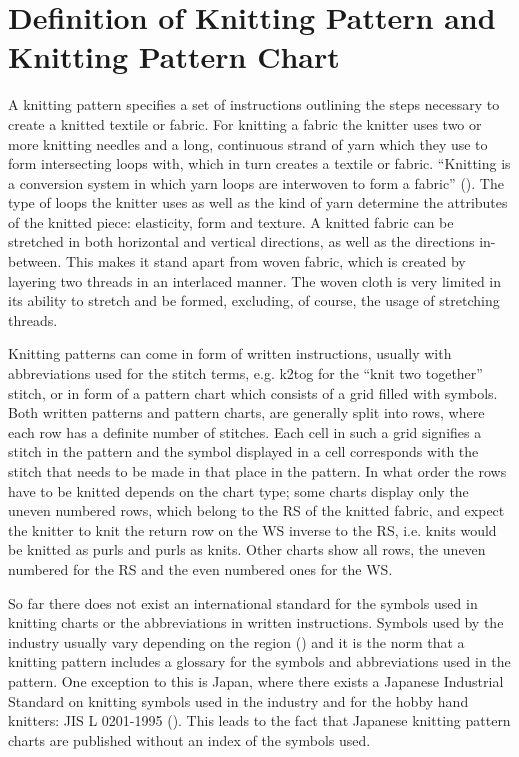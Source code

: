 \section{Definition of Knitting Pattern and Knitting Pattern Chart}

A knitting pattern specifies a set of instructions outlining the steps necessary to create a knitted textile or fabric. For knitting a fabric the knitter uses two or more knitting needles and a long, continuous strand of yarn which they use to form intersecting loops with, which in turn creates a textile or fabric. ``Knitting is a conversion system in which yarn loops are interwoven to form a fabric'' (\cite[p17]{Raz1993}). The type of loops the knitter uses as well as the kind of yarn determine the attributes of the knitted piece: elasticity, form and texture. A knitted fabric can be stretched in both horizontal and vertical directions, as well as the directions in-between. This makes it stand apart from woven fabric, which is created by layering two threads in an interlaced manner. The woven cloth is very limited in its ability to stretch and be formed, excluding, of course, the usage of stretching threads.

Knitting patterns can come in form of written instructions, usually with abbreviations used for the stitch terms, e.g. k2tog for the ``knit two together'' stitch, or in form of a pattern chart which consists of a grid filled with symbols. Both written patterns and pattern charts, are generally split into rows, where each row has a definite number of stitches. Each cell in such a grid signifies a stitch in the pattern and the symbol displayed in a cell corresponds with the stitch that needs to be made in that place in the pattern. In what order the rows have to be knitted depends on the chart type; some charts display only the uneven numbered rows, which belong to the \gls{RS} of the knitted fabric, and expect the knitter to knit the return row on the \gls{WS} inverse to the \gls{RS}, i.e. knits would be knitted as purls and purls as knits. Other charts show all rows, the uneven numbered for the \gls{RS} and the even numbered ones for the WS.

So far there does not exist an international standard for the symbols used in knitting charts or the abbreviations in written instructions. Symbols used by the industry usually vary depending on the region (\cite[p57]{Raz1993}) and it is the norm that a knitting pattern includes a glossary for the symbols and abbreviations used in the pattern. One exception to this is Japan, where there exists a Japanese Industrial Standard on knitting symbols used in the industry and for the hobby hand knitters: JIS L 0201-1995 (\cite{JKCA1995}). This leads to the fact that Japanese knitting pattern charts are published without an index of the symbols used.

